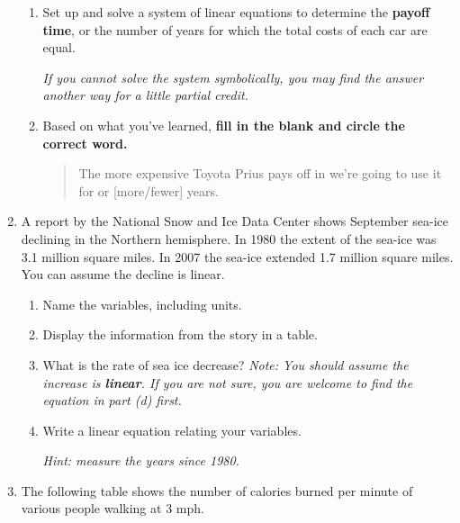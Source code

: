 \documentclass[12pt]{article}
\begin{document}
\begin{enumerate}
\begin{enumerate}
\item Set up and solve a system of linear equations to determine the \textbf{payoff time}, or the number of years for which the total costs of each car are equal.

\emph{If you cannot solve the system symbolically, you may find the answer another way for a little partial credit.}
\vfill

\item Based on what you've learned, \textbf{fill in the blank and circle the correct word.}

\begin{quote}
The more expensive Toyota Prius pays off in we're going to use it for \hrulefill   or [more/fewer] years.  
\end{quote}

\end{enumerate}
\newpage



\item A report by the National Snow and Ice Data Center shows September sea-ice declining in the Northern hemisphere. In 1980 the extent of the sea-ice was 3.1 million square miles.  In 2007 the sea-ice extended 1.7 million square miles.  You can assume the decline is linear.

\begin{enumerate}
\item Name the variables, including units.
\vfill
\item Display the information from the story in a table.
\vfill
\item What is the rate of sea ice decrease?  \emph{Note:  You should assume the increase is \textbf{linear}. If you are not sure, you are welcome to find the equation in part (d) first.}
\vfill
\item Write a linear equation relating your variables.

\emph{Hint:  measure the years since 1980.}
\vfill
\end{enumerate}


\newpage %


\item The following table shows the number of calories burned per minute of various people walking at 3 mph.


\end{enumerate}
\end{document}

